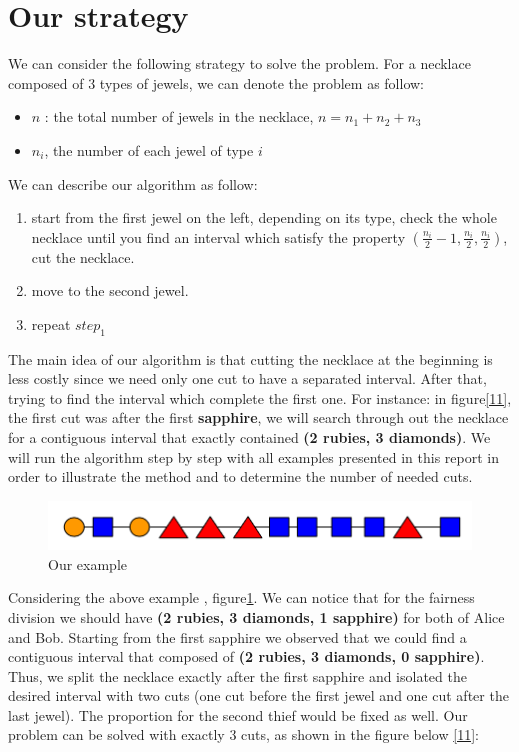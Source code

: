 \documentclass[a4paper,10pt]{article}
\begin{document}
\section{Our strategy}
We can consider the following strategy to solve the problem. For a necklace composed of 3 types of jewels, we can denote the problem as follow:

\begin{itemize}
    \item $n$ : the total number of jewels in the necklace, $n = n_1 + n_2 + n_3$
    \item $n_i$, the number of each jewel of type $i$
\end{itemize}
We can describe our algorithm as follow:

\begin{enumerate}

    \item start from the first jewel on the left, depending on its type, check the whole necklace until you find an interval which satisfy the property $(\frac{n_i}{2} - 1, \frac{n_i}{2}, \frac{n_i}{2})$, cut the necklace.
    \item move to the second jewel.
    \item repeat $step_1$


\end{enumerate}
The main idea of our algorithm is that cutting the necklace at the beginning is less costly since we need only one cut to have a separated interval. After that, trying to find the interval which complete the first one. For instance: in figure\ref{11}, the first cut was after the first \textbf{sapphire}, we will search through out the necklace for a contiguous interval that exactly contained \textbf{(2 rubies, 3 diamonds)}. We will run the algorithm step by step with all examples presented in this report in order to illustrate the method and to determine the number of needed cuts.

\begin{figure}[H]
  \centering
\includegraphics[scale=.4]{0_step (1).png}
\caption{Our example}
\label{10}
\end{figure}
Considering the above example , figure\ref{10}. We can notice that for the fairness division we should have \textbf{(2 rubies, 3 diamonds, 1 sapphire)} for both of Alice and Bob. Starting from the first sapphire we observed that we could find a contiguous interval that composed of \textbf{(2 rubies, 3 diamonds, 0 sapphire)}. Thus, we split the necklace exactly after the first sapphire and isolated the desired interval with two cuts (one cut before the first jewel and one cut after the last jewel). The proportion for the second thief would be fixed as well. Our problem can be solved with exactly 3 cuts, as shown in the figure below \ref{11}:
\end{document}
